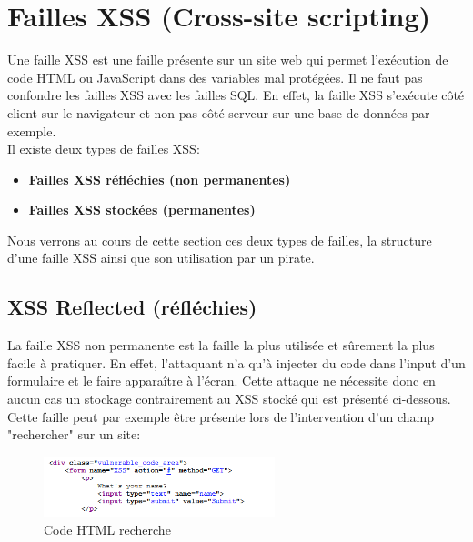\newpage

\section{Failles XSS (Cross-site scripting)}

Une faille XSS est une faille présente sur un site web qui permet l'exécution de code HTML ou JavaScript dans des variables mal protégées. Il ne faut pas confondre les failles XSS avec les failles SQL. En effet, la faille XSS s'exécute côté client sur le navigateur et non pas côté serveur sur une base de données par exemple.\\

 Il existe deux types de failles XSS:

\begin{itemize}
    \item \textbf{Failles XSS réfléchies (non permanentes)}
    \item \textbf{Failles XSS stockées (permanentes)}
\end{itemize}

 Nous verrons au cours de cette section ces deux types de failles, la structure d'une faille XSS ainsi que son utilisation par un pirate.

\subsection{XSS Reflected (réfléchies) }

La faille XSS non permanente est la faille la plus utilisée et sûrement la plus facile à pratiquer. En effet, l’attaquant n'a qu’à injecter du code dans l’input d’un formulaire et le faire apparaître à l’écran. Cette attaque ne nécessite donc en aucun cas un stockage contrairement au XSS stocké qui est présenté ci-dessous. Cette faille peut par exemple être présente lors de l'intervention d'un champ "rechercher" sur un site:

\begin{figure}[htp!]
  \centering
  \setlength\figureheight{7cm}
  \setlength\figurewidth{9cm}
  \includegraphics[width=0.6\textwidth]{oui/images/xss/xss.PNG}
  \caption{Code HTML recherche}
  \label{fig:courbe-tikz}
\end{figure}

